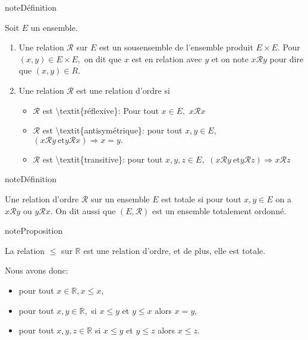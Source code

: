 \documentclass[letterpaper,10pt,french]{jupyterBook}
\begin{document}
\begin{sphinxadmonition}{note}{Définition}

\sphinxAtStartPar
Soit \(E\) un ensemble.
\begin{enumerate}
%
\item {} 
\sphinxAtStartPar
Une relation \(\mathcal{R}\) sur \(E\) est un sous\sphinxhyphen{}ensemble de l’ensemble produit \(E\times E.\) Pour \((x,y)\in E\times E,\) on dit que \(x\) est en relation avec \(y\) et on note \(x\mathcal{R}y\) pour dire que \((x,y)\in R.\)

\item {} 
\sphinxAtStartPar
Une relation \(\mathcal{R}\) est une relation d’ordre si
\begin{itemize}
\item {} 
\sphinxAtStartPar
\(\mathcal{R}\) est \textbackslash{}textit\{réflexive\}: Pour tout \(x\in E,\) \(x\mathcal{R}x\)

\item {} 
\sphinxAtStartPar
\(\mathcal{R}\) est \textbackslash{}textit\{antisymétrique\}: pour tout \(x,y\in E,\) \((x\mathcal{R}y\:\mbox{et} y\mathcal{R}x) \Rightarrow x=y.\)

\item {} 
\sphinxAtStartPar
\(\mathcal{R}\) est \textbackslash{}textit\{transitive\}: pour tout \(x,y,z\in E,\) \((x\mathcal{R}y\:\mbox{et} y\mathcal{R}z)\Rightarrow x\mathcal{R}z\)

\end{itemize}

\end{enumerate}
\end{sphinxadmonition}

\begin{sphinxadmonition}{note}{Définition}

\sphinxAtStartPar
Une relation d’ordre \(\mathcal{R}\) sur un ensemble \(E\) est totale si pour tout \(x, y\in E\) on a \(x\mathcal{R}y\) ou \(y\mathcal{R}x.\) On dit aussi que
\((E,\mathcal{R})\) est un ensemble totalement ordonné.
\end{sphinxadmonition}

\begin{sphinxadmonition}{note}{Proposition}

\sphinxAtStartPar
La relation \(\leq\) sur \(\mathbb{R}\) est une relation d’ordre, et de plus, elle est totale.
\end{sphinxadmonition}

\sphinxAtStartPar
Nous avons donc:
\begin{itemize}
\item {} 
\sphinxAtStartPar
pour tout \(x\in \mathbb{R}, x\leq x,\)

\item {} 
\sphinxAtStartPar
pour tout \(x, y \in \mathbb{R},\) si \(x\leq y\) et \(y\leq x\) alors \(x=y,\)

\item {} 
\sphinxAtStartPar
pour tout \(x, y, z\in\mathbb{R}\) si \(x \leq y\) et \(y \leq z\) alors \(x \leq z.\)

\end{itemize}
\end{document}
